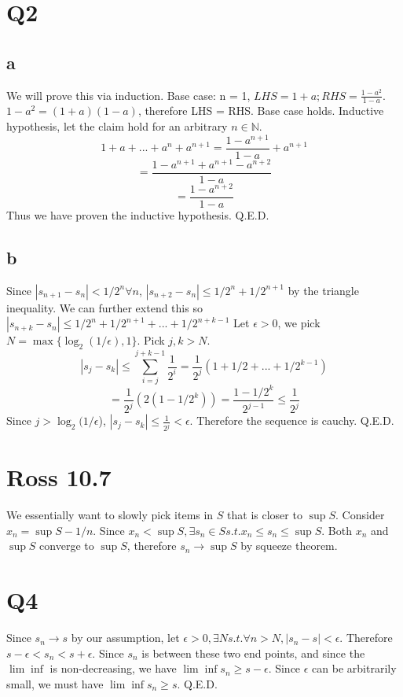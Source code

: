 \documentclass[12pt]{article}
\newcommand{\N}{\mathbb{N}}
\begin{document}
\section{Q2}
\subsection{a}
We will prove this via induction.
\newline
Base case: n = 1, $LHS = 1+a; RHS = \frac{1-a^{2}}{1-a}$. $1-a^2 = (1+a)(1-a)$, therefore LHS = RHS. Base case holds.
\newline
Inductive hypothesis, let the claim hold for an arbitrary $n \in \N$.
$$1+a+...+a^n+a^{n+1} = \frac{1-a^{n+1}}{1-a}+a^{n+1}$$
$$=\frac{1-a^{n+1}+a^{n+1}-a^{n+2}}{1-a}$$
$$=\frac{1-a^{n+2}}{1-a}$$
Thus we have proven the inductive hypothesis. Q.E.D.

\subsection{b}
Since $|s_{n+1}-s_n|<1/2^n \forall n$, $|s_{n+2}-s_n| \leq 1/2^n + 1/2^{n+1}$ by the triangle inequality. We can further extend this so $|s_{n+k}-s_n| \leq 1/2^n + 1/2^{n+1} + ... +1/2^{n+k-1}$
\newline
Let $\epsilon > 0$, we pick $N = \max \{ \log_2 (1/\epsilon), 1\}$. Pick $j,k > N$.
$$|s_j - s_k| \leq \sum ^{j+k-1}_{i=j} \frac{1}{2^i} = \frac{1}{2^j}(1+1/2+...+1/2^{k-1})$$
$$=\frac{1}{2^j}(2(1-1/2^{k})) = \frac{1-1/2^k}{2^{j-1}} \leq \frac{1}{2^j}$$
Since $j> \log_2 (1/\epsilon$), $|s_j - s_k|\leq \frac{1}{2^j} < \epsilon$.
\newline
Therefore the sequence is cauchy. Q.E.D.
\newpage


\section{Ross 10.7}
We essentially want to slowly pick items in $S$ that is closer to $\sup S$.
\newline
Consider $x_n = \sup S - 1/n$. Since $x_n < \sup S, \exists s_n \in S s.t. x_n \leq s_n \leq \sup S$. Both $x_n$ and $\sup S$ converge to $\sup S$, therefore $s_n \to \sup S$ by squeeze theorem.
\newpage


\section{Q4}
Since $s_n \to s$ by our assumption, let $\epsilon > 0, \exists N s.t. \forall n>N, |s_n - s| < \epsilon$.
\newline
Therefore $s-\epsilon < s_n < s + \epsilon$. Since $s_n$ is between these two end points, and since the $\lim \inf$ is non-decreasing, we have $\lim \inf s_n \geq s-\epsilon$.
\newline
Since $\epsilon$ can be arbitrarily small, we must have $\lim \inf s_n \geq s$. Q.E.D.
\newpage
\end{document}
